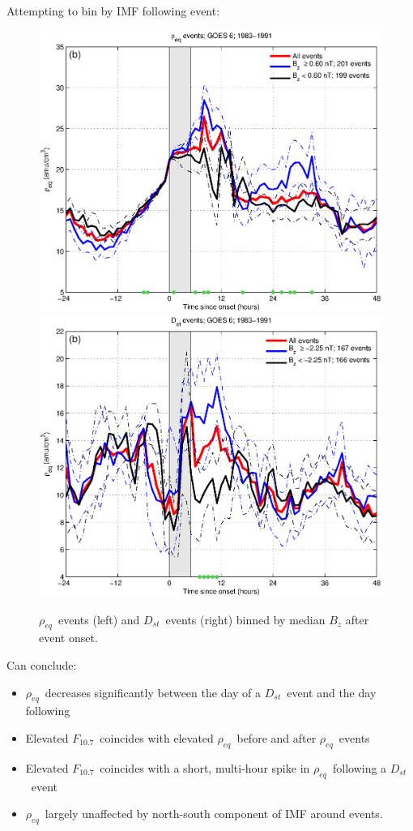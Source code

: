 \documentclass[xcolor={dvipsnames,table}]{beamer}
\newcommand{\req}{\ensuremath{\rho_{eq}}} %
\newcommand{\dst}{\ensuremath{D_{st}}} %
\newcommand{\f}{\ensuremath{F_{10.7}}} %
\begin{document}
\begin{frame}
	Attempting to bin by IMF following event:
		\begin{figure}[htp!]
			\centering
			\includegraphics[width=0.5\linewidth]{Figures/RhoBinnedB_z-case24-t025-tf30-GOES6}
			\includegraphics[width=0.5\linewidth]{Figures/RhoBinnedB_z-case1-t025-tf30-GOES6}
			\caption{\req\ events (left) and \dst\ events (right) binned by median $B_z$ after event onset.}
			\label{fig:RhoBinnedF107}
		\end{figure}
\end{frame}

\begin{frame}
	Can conclude:
	\begin{itemize}
		\item \req\ decreases significantly between the day of a \dst\ event and the day following
		\item Elevated \f\ coincides with elevated \req\ before and after \req\ events
		\item Elevated \f\ coincides with a short, multi-hour spike in \req\ following a \dst\ event
		\item \req\ largely unaffected by north-south component of IMF around events.
	\end{itemize}
\end{frame}
\end{document}
